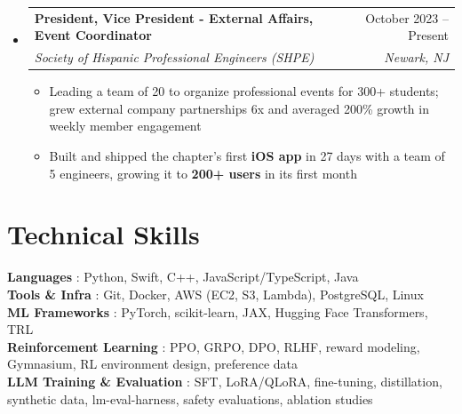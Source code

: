 \documentclass[letterpaper,10pt]{article}
\makeatletter
\newcommand{\resumeItem}[1]{
  \item\small{
    {#1 \vspace{-3pt}}
  }
}
\newcommand{\resumeSubheading}[4]{
  \vspace{-3pt}\item
    \begin{tabular*}{0.97\textwidth}[t]{l@{\extracolsep{\fill}}r}
      \textbf{#1} & #2 \\
      \textit{\small#3} & \textit{\small #4} \\
    \end{tabular*}\vspace{-9pt}
}
\newcommand{\resumeSubHeadingListStart}{\begin{itemize}[leftmargin=0.15in, label={}]}
\newcommand{\resumeSubHeadingListEnd}{\end{itemize}}
\newcommand{\resumeItemListStart}{\begin{itemize}}
\newcommand{\resumeItemListEnd}{\end{itemize}\vspace{-7pt}}
\makeatother
\begin{document}
\resumeSubHeadingListStart

\vspace{5pt}
\resumeSubheading
{President, Vice President - External Affairs, Event Coordinator}{October 2023 -- Present}
{Society of Hispanic Professional Engineers (SHPE)}{Newark, NJ}

\vspace{5pt}
\resumeItemListStart
\resumeItem{Leading a team of 20 to organize professional events for 300+ students; grew external company partnerships 6x and averaged 200\% growth in weekly member engagement}
\resumeItem{Built and shipped the chapter's first \textbf{iOS app} in 27 days with a team of 5 engineers, growing it to \textbf{200+ users} in its first month}
\resumeItemListEnd

\resumeSubHeadingListEnd

\section{Technical Skills}
\begin{itemize}[leftmargin=0.15in, itemsep=0pt, label={}]
  \small{\item{
        \textbf{Languages }{: Python, Swift, C++, JavaScript/TypeScript, Java} \\
        \vspace{2pt}
        \textbf{Tools \& Infra }{: Git, Docker, AWS (EC2, S3, Lambda), PostgreSQL, Linux} \\        
        \vspace{2pt}
        \textbf{ML Frameworks }{: PyTorch, scikit-learn, JAX, Hugging Face Transformers, TRL} \\
        \vspace{2pt}
        \textbf{Reinforcement Learning }{: PPO, GRPO, DPO, RLHF, reward modeling, Gymnasium, RL environment design, preference data} \\
        \vspace{2pt}
        \textbf{LLM Training \& Evaluation }{: SFT, LoRA/QLoRA, fine-tuning, distillation, synthetic data, lm-eval-harness, safety evaluations, ablation studies}
        }}
\end{itemize}
\end{document}
